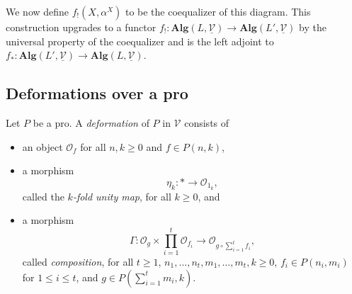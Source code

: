 \documentclass{tac}
\begin{document}
We now define $f_!(X,\alpha^X)$ to be the coequalizer of this diagram. This construction upgrades to a functor $f_!:\mathbf{Alg}(L,\underline{\mathcal{V}})\to \mathbf{Alg}(L',\underline{\mathcal{V}})$ by the universal property of the coequalizer and is the left adjoint to $f_*:\mathbf{Alg}(L',\underline{\mathcal{V}})\to \mathbf{Alg}(L,\underline{\mathcal{V}})$. 

\subsection*{Deformations over a pro}

\begin{definition}
    Let $P$ be a pro. A \emph{deformation} of $P$ in $\mathcal{V}$ consists of \begin{itemize}
    \item an object $\mathcal{O}_{f}$ for all $n,k\geq 0$ and $f\in P(n,k)$,
    \item a morphism
    \[
    \eta_k:*\to \mathcal{O}_{1_k},
    \]
    called the \emph{$k$-fold unity map}, for all $k\geq 0$, and
    \item a morphism
    \[
    \Gamma:\mathcal{O}_{g}\times\prod_{i=1}^t\mathcal{O}_{f_i}\to\mathcal{O}_{g\circ\sum_{i=1}^tf_i},
    \]
   called \emph{composition}, for all $t\geq 1$, $n_1,\dots,n_t,m_1,\dots,m_t,k\geq 0$, $f_i\in P(n_i,m_i)$ for $1\leq i\leq t$, and $g\in P(\sum_{i=1}^tm_i,k)$.
   

\end{itemize}
\end{definition}
\end{document}
